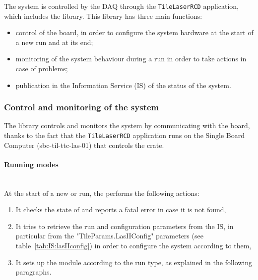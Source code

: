 

The \lasii{} system is controlled by the \atlas{} DAQ through the {\tt TileLaserRCD} application,
which includes the \lasmodule{} library. This library has three main functions:
\begin{itemize}
\item control of the \lascar{} \vme{} board, in order to configure the \lasii{} system
hardware at the start of a new run and at its end;
\item monitoring of the \lasii{} system behaviour during a run in order to take actions in
case of problems;
\item publication in the Information Service (IS) of the status of the \lasii{} system.
\end{itemize}

\subsubsection{Control and monitoring of the system}
The \lasmodule{} library controls and monitors the \lasii{} system by communicating with the
\lascar{} board, thanks to the fact that the {\tt TileLaserRCD} application runs on the
Single Board Computer (sbc-til-ttc-las-01) that controls the \lasii{} \vme{} crate.

\paragraph{Running modes}
~~\\
At the start of a new \atlas{} or \tilecal{} run, the \lasmodule{} performs the following
actions:
\begin{enumerate}
\item It checks the state of \lascar{} and reports a fatal error in case it is not found,
\item It tries to retrieve the run and configuration parameters from the IS, in particular
from the "TileParams.LasIIConfig" parameters (see table~\ref{tab:IS:lasIIconfig}) in order to configure the \lasii{}
system according to them,
\item It sets up the \lascar{} module according to the run type, as explained
in the following paragraphs.
\end{enumerate}

